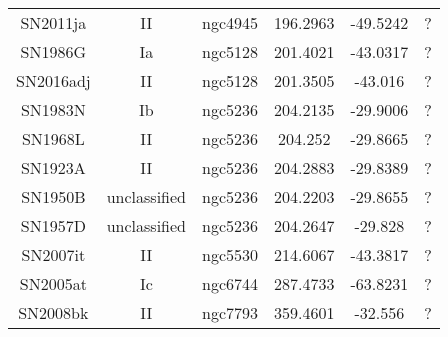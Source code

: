 \begin{table}
\begin{tabular}{cccccc}
SN2011ja & II & ngc4945 & 196.2963 & -49.5242 & ? \\
SN1986G & Ia & ngc5128 & 201.4021 & -43.0317 & ? \\
SN2016adj & II & ngc5128 & 201.3505 & -43.016 & ? \\
SN1983N & Ib & ngc5236 & 204.2135 & -29.9006 & ? \\
SN1968L & II & ngc5236 & 204.252 & -29.8665 & ? \\
SN1923A & II & ngc5236 & 204.2883 & -29.8389 & ? \\
SN1950B & unclassified & ngc5236 & 204.2203 & -29.8655 & ? \\
SN1957D & unclassified & ngc5236 & 204.2647 & -29.828 & ? \\
SN2007it & II & ngc5530 & 214.6067 & -43.3817 & ? \\
SN2005at & Ic & ngc6744 & 287.4733 & -63.8231 & ? \\
SN2008bk & II & ngc7793 & 359.4601 & -32.556 & ? \\
\end{tabular}
\end{table}
